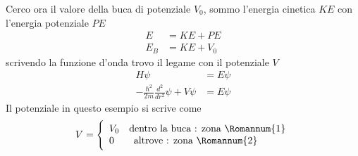 Cerco ora il valore della buca di potenziale $V_0$, sommo l'energia cinetica $KE$ con l'energia potenziale $PE$
\begin{equation}
\begin{split}
E & = KE + PE \\
E_B & = KE + V_0
\end{split}
\end{equation}
scrivendo la funzione d'onda trovo il legame con il potenziale $V$
\begin{equation}
\begin{split}
H \psi & = E \psi \\
- \frac{\hbar^2}{2m} \frac{d^2}{dr^2} \psi + V \psi & = E \psi
\end{split}
\end{equation}
Il potenziale in questo esempio si scrive come
\begin{equation}
V = 
\Bigg\{\begin{array}{l}
V_0 \quad\mbox{dentro la buca : zona \Romannum{1}} \\
0 \quad\quad\mbox{altrove : zona \Romannum{2}}
\end{array}
\end{equation}













